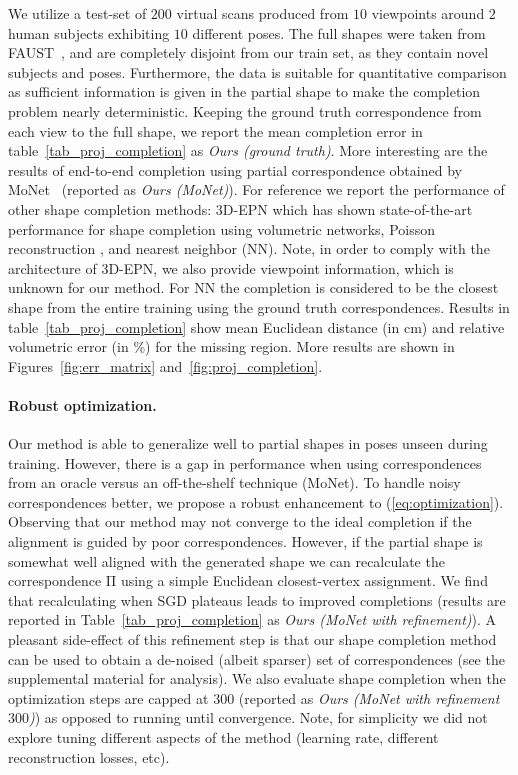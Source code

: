 \documentclass[10pt,twocolumn,letterpaper]{article}
\newcommand{\bb}[1]{\bm{\mathrm{#1}}}
\begin{document}
We utilize a test-set of $200$ virtual scans produced from $10$ viewpoints around $2$ human subjects exhibiting $10$ different poses. The full shapes were taken from FAUST~\cite{Bogo:CVPR:2014}, and are completely disjoint from our train set, as they contain novel subjects and poses. Furthermore, the data is suitable for quantitative comparison as sufficient information is given in the partial shape to make the completion problem nearly deterministic. Keeping the ground truth correspondence from each view to the full shape, we report the mean completion error in table~\ref{tab_proj_completion} as \emph{Ours (ground truth)}. More interesting are the results of end-to-end completion using partial correspondence obtained by MoNet~\cite{monet} (reported as \emph{Ours (MoNet)}). For reference we report the performance of other shape completion methods: 3D-EPN \cite{dai2016shape} which has shown state-of-the-art performance for shape completion using volumetric networks, Poisson reconstruction \cite{kazhdan2013screened}, and nearest neighbor (NN). Note, in order to comply with the architecture of 3D-EPN, we also provide viewpoint information, which is unknown for our method. For NN the completion is considered to be the closest shape from the entire training using the ground truth correspondences. Results in table~\ref{tab_proj_completion} show mean Euclidean distance (in cm) and relative volumetric error (in \%) for the missing region. More results are shown in Figures~\ref{fig:err_matrix} and~\ref{fig:proj_completion}.

\paragraph{Robust optimization.}
Our method is able to generalize well to partial shapes in poses unseen during training. However, there is a gap in performance when using correspondences from an oracle versus an off-the-shelf technique (MoNet). To handle noisy correspondences better, we propose a robust enhancement to (\ref{eq:optimization}). Observing that our method may not converge to the ideal completion if the alignment is guided by poor correspondences. However, if the partial shape is somewhat well aligned with the generated shape we can recalculate the correspondence $\bb{\Pi}$ using a simple Euclidean closest-vertex assignment. We find that recalculating when SGD plateaus leads to improved completions (results are reported in Table~\ref{tab_proj_completion} as \emph{Ours (MoNet with refinement)}).
A pleasant side-effect of this refinement step is that our shape completion method can be used to obtain a de-noised (albeit sparser) set  of correspondences (see the supplemental material for analysis).
We also evaluate shape completion when the optimization steps are capped at 300 (reported as \emph{Ours (MoNet with refinement $300$)}) as opposed to running until convergence. Note, for simplicity we did not explore tuning different aspects of the method (learning rate, different reconstruction losses, etc).
\end{document}
